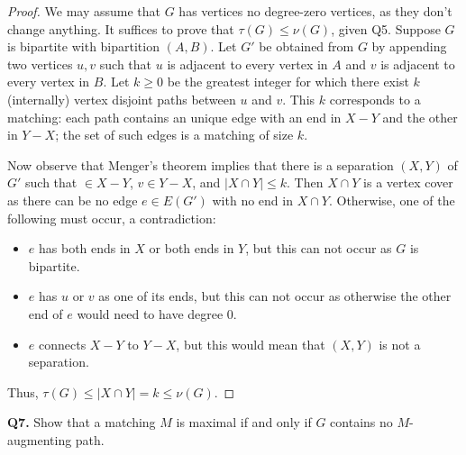 \documentclass{article}
\begin{document}
\begin{proof}
We may assume that \( G \) has vertices no degree-zero vertices, as they don't change anything. It suffices to prove that \( \tau (G) \leq \nu (G) \), given Q5. Suppose \( G \) is bipartite with bipartition \( (A,B) \). Let \( G' \) be obtained from \( G \) by appending two vertices \( u,v \) such that \( u \) is adjacent to every vertex in \( A \) and \( v \) is adjacent to every vertex in \( B \). Let \( k \geq 0 \) be the greatest integer for which there exist \( k \) (internally) vertex disjoint paths between \( u \) and \( v \). This \( k \) corresponds to a matching: each path contains an unique edge with an end in \( X - Y \) and the other in \( Y - X \); the set of such edges is a matching of size \( k \).

Now observe that Menger's theorem implies that there is a separation \( (X, Y) \) of \( G' \) such that \(  \in X - Y \), \( v \in Y - X \), and \( |X \cap Y| \leq k \). Then \( X \cap Y \) is a vertex cover as there can be no edge \( e \in E(G') \) with no end in \( X \cap Y \). Otherwise, one of the following must occur, a contradiction: 
\begin{itemize}[nolistsep]
	\item \( e \) has both ends in \( X \) or both ends in \( Y \), but this can not occur as \( G \) is bipartite.
	\item \( e \) has \( u \) or \( v \) as one of its ends, but this can not occur as otherwise the other end of \( e \) would need to have degree 0.
	\item \( e \) connects \( X - Y \) to \( Y - X \), but this would mean that \( (X,Y) \) is not a separation.
\end{itemize}
Thus, \( \tau (G) \leq |X \cap Y| = k \leq \nu (G) \).
\end{proof}
\noindent \textbf{Q7.} Show that a matching \( M \) is maximal if and only if \( G \) contains no \( M \)-augmenting path.
\end{document}
